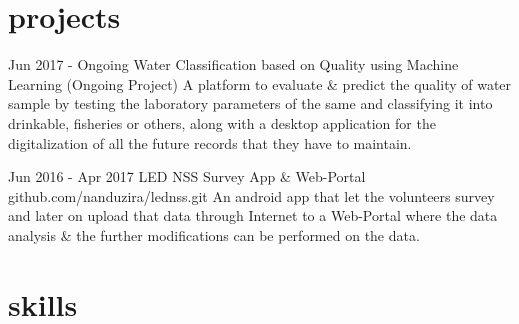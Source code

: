 \documentclass[]{friggeri-cv}
\begin{document}
\section{projects}
\begin{entrylist}
	
	\entry
	{Jun 2017 - Ongoing}
	{Water Classification based on Quality using Machine Learning {\normalfont }}
	{(Ongoing Project)}
	{A platform to evaluate \& predict the quality of water sample by testing the laboratory parameters of the same and classifying it into drinkable, fisheries or others, along with a desktop application for the digitalization of all the future records that they have to maintain.}
	
	
	\entry
	{Jun 2016 - Apr 2017}
	{LED NSS Survey App \& Web-Portal}
	{github.com/nanduzira/lednss.git }
	{An android app that let the volunteers survey and later on upload that data through Internet to a Web-Portal where the data analysis \& the further modifications can be performed on the data.}
	
\end{entrylist}
\newline

\section{skills}
\begin{entrylist}
\end{entrylist}
\newline

\newpage
\end{document}
